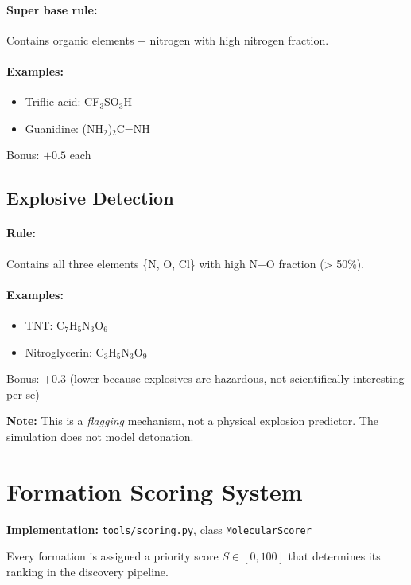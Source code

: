 \documentclass[11pt]{article}
\begin{document}
\paragraph{Super base rule:} Contains organic elements + nitrogen with high nitrogen fraction.

\paragraph{Examples:}
\begin{itemize}
\item Triflic acid: CF$_3$SO$_3$H
\item Guanidine: (NH$_2$)$_2$C=NH
\end{itemize}

Bonus: $+0.5$ each

\subsection{Explosive Detection}

\paragraph{Rule:} Contains all three elements \{N, O, Cl\} with high N+O fraction (> 50\%).

\paragraph{Examples:}
\begin{itemize}
\item TNT: C$_7$H$_5$N$_3$O$_6$
\item Nitroglycerin: C$_3$H$_5$N$_3$O$_9$
\end{itemize}

Bonus: $+0.3$ (lower because explosives are hazardous, not scientifically interesting per se)

\textbf{Note:} This is a \textit{flagging} mechanism, not a physical explosion predictor. The simulation does not model detonation.

\section{Formation Scoring System}

\textbf{Implementation:} \texttt{tools/scoring.py}, class \texttt{MolecularScorer}

Every formation is assigned a priority score $S \in [0, 100]$ that determines its ranking in the discovery pipeline.
\end{document}

